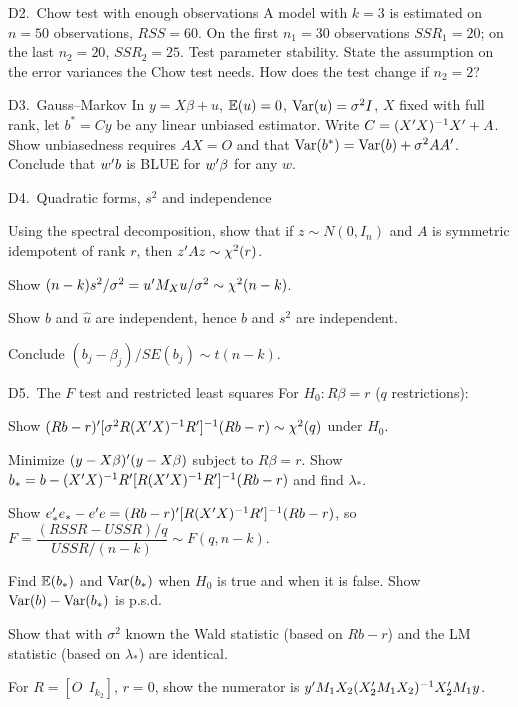 \documentclass[11pt]{article}
\newcommand{\newtag}{\tcbox[on line, colback=qnavy!60, colframe=qnavy!60, coltext=white,
  boxsep=1pt, left=3pt, right=3pt, top=0pt, bottom=0pt, arc=1.5pt]{\scriptsize\sffamily\bfseries NEW}}
\begin{document}
\begin{qbox}{D2.\ Chow test with enough observations}{\newtag}
A model with $k = 3$ is estimated on $n = 50$ observations, $RSS = 60$. On the
first $n_{1} = 30$ observations $SSR_{1} = 20$; on the last $n_{2} = 20$,
$SSR_{2} = 25$. Test parameter stability. State the assumption on the error
variances the Chow test needs. How does the test change if $n_{2} = 2$?
\end{qbox}

\begin{qbox}{D3.\ Gauss--Markov}{\newtag}
In $y = X\beta + u$, $\mathbb{E}(u) = 0$, $\operatorname{Var}(u) = \sigma^{2}I$, $X$ fixed with full rank,
let $b^{*} = Cy$ be any linear unbiased estimator. Write $C = (X^{\prime} X)^{-1}X^{\prime} + A$.
Show unbiasedness requires $AX = O$ and that $\operatorname{Var}(b^{*}) = \operatorname{Var}(b) + \sigma^{2}AA^{\prime}$.
Conclude that $w^{\prime} b$ is BLUE for $w^{\prime}\beta$ for any $w$.
\end{qbox}

\begin{qbox}{D4.\ Quadratic forms, $s^{2}$ and independence}{\newtag}
\begin{flatlist}
  \item[(a)] Using the spectral decomposition, show that if $z \sim N(0,I_{n})$ and $A$ is
        symmetric idempotent of rank $r$, then $z^{\prime} Az \sim \chi^{2}(r)$.
  \item[(b)] Show $(n-k)s^{2}/\sigma^{2} = u^{\prime} M_{X}u/\sigma^{2} \sim \chi^{2}(n-k)$.
  \item[(c)] Show $b$ and $\hat u$ are independent, hence $b$ and $s^{2}$ are independent.
  \item[(d)] Conclude $(b_{j} - \beta_{j})/SE(b_{j}) \sim t(n-k)$.
\end{flatlist}
\end{qbox}

\begin{qbox}{D5.\ The $F$ test and restricted least squares}{\newtag}
For $H_{0}: R\beta = r$ ($q$ restrictions):
\begin{flatlist}
  \item[(a)] Show $(Rb - r)^{\prime}[\sigma^{2}R(X^{\prime} X)^{-1}R^{\prime}]^{-1}(Rb - r) \sim \chi^{2}(q)$ under $H_{0}$.
  \item[(b)] Minimize $(y - X\beta)^{\prime}(y - X\beta)$ subject to $R\beta = r$. Show
        $b_{*} = b - (X^{\prime} X)^{-1}R^{\prime}[R(X^{\prime} X)^{-1}R^{\prime}]^{-1}(Rb - r)$ and find $\lambda_{*}$.
  \item[(c)] Show $e_{*}^{\prime} e_{*} - e^{\prime} e = (Rb - r)^{\prime}[R(X^{\prime} X)^{-1}R^{\prime}]^{-1}(Rb - r)$,
        so $F = \dfrac{(RSSR - USSR)/q}{USSR/(n-k)} \sim F(q, n-k)$.
  \item[(d)] Find $\mathbb{E}(b_{*})$ and $\operatorname{Var}(b_{*})$ when $H_{0}$ is true and when it is false.
        Show $\operatorname{Var}(b) - \operatorname{Var}(b_{*})$ is p.s.d.
  \item[(e)] Show that with $\sigma^{2}$ known the Wald statistic (based on $Rb - r$) and the
        LM statistic (based on $\lambda_{*}$) are identical.
  \item[(f)] For $R = [O\ \ I_{k_{2}}]$, $r = 0$, show the numerator is
        $y^{\prime} M_{1}X_{2}(X_{2}^{\prime} M_{1}X_{2})^{-1}X_{2}^{\prime} M_{1}y$.
\end{flatlist}
\end{qbox}
\end{document}
